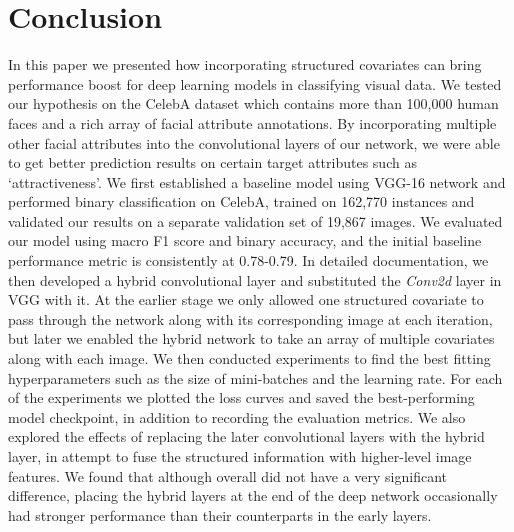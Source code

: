 \documentclass[12pt]{article}
\begin{document}
\section{Conclusion}
In this paper we presented how incorporating structured covariates can bring performance boost for deep learning models in classifying visual data. We tested our hypothesis on the CelebA dataset which contains more than 100,000 human faces and a rich array of facial attribute annotations. By incorporating multiple other facial attributes into the convolutional layers of our network, we were able to get better prediction results on certain target attributes such as `attractiveness'. We first established a baseline model using VGG-16 network and performed binary classification on CelebA, trained on 162,770 instances and validated our results on a separate validation set of 19,867 images. We evaluated our model using macro F1 score and binary accuracy, and the initial baseline performance metric is consistently at 0.78-0.79. In detailed documentation, we then developed a hybrid convolutional layer and substituted the \textit{Conv2d} layer in VGG with it. At the earlier stage we only allowed one structured covariate to pass through the network along with its corresponding image at each iteration, but later we enabled the hybrid network to take an array of multiple covariates along with each image. We then conducted experiments to find the best fitting hyperparameters such as the size of mini-batches and the learning rate. For each of the experiments we plotted the loss curves and saved the best-performing model checkpoint, in addition to recording the evaluation metrics. We also explored the effects of replacing the later convolutional layers with the hybrid layer, in attempt to fuse the structured information with higher-level image features. We found that although overall did not have a very significant difference, placing the hybrid layers at the end of the deep network occasionally had stronger performance than their counterparts in the early layers. 
\end{document}
